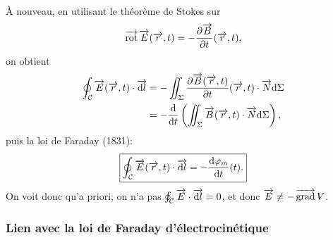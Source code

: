 À nouveau, en utilisant le théorème de Stokes sur
\begin{equation*}
    \vecrot\vec{E}(\vec{r},t)=-\frac{\partial\vec{B}}{\partial t}(\vec{r},t),    
\end{equation*}
on obtient
\begin{align*}
    \oint_{\mathcal{C}}\vec{E}(\vec{r},t)\cdot\vec{\rmd l}
    &=-\iint_{\Sigma}\frac{\partial\vec{B}(\vec{r},t)}{\partial t}(\vec{r},t)\cdot\vec{N}\rmd\Sigma\\
    &=-\frac{\rmd}{\rmd t}\left(\iint_{\Sigma}\vec{B}(\vec{r},t)\cdot\vec{N}\rmd\Sigma\right),
\end{align*}
puis la loi de Faraday (1831):
\begin{equation*}
    \boxed{
        \oint_{\mathcal{C}}\vec{E}(\vec{r},t)\cdot\vec{\rmd l}=-\frac{\rmd\varphi_m}{\rmd t}(t).
    }
\end{equation*}
On voit donc qu'a priori, on n'a pas $\oint_{\mathcal{C}}\vec{E}\cdot\vec{\rmd l}=0$, et donc $\vec{E}\neq-\vecgrad V$.

\subsubsection{Lien avec la loi de Faraday d'électrocinétique}

